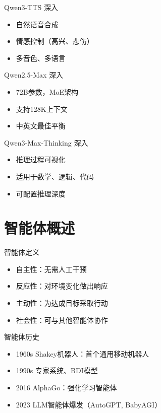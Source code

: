 \begin{frame}{Qwen3-TTS 深入}
\begin{itemize}
\item 自然语音合成
\item 情感控制（高兴、悲伤）
\item 多音色、多语言
\end{itemize}
\end{frame}
\begin{frame}{Qwen2.5-Max 深入}
\begin{itemize}
\item 72B参数，MoE架构
\item 支持128K上下文
\item 中英文最佳平衡
\end{itemize}
\end{frame}
\begin{frame}{Qwen3-Max-Thinking 深入}
\begin{itemize}
\item 推理过程可视化
\item 适用于数学、逻辑、代码
\item 可配置推理深度
\end{itemize}
\end{frame}


\section{智能体概述}

\begin{frame}{智能体定义}
\begin{center}
\end{center}
\begin{itemize}
\item 自主性：无需人工干预
\item 反应性：对环境变化做出响应
\item 主动性：为达成目标采取行动
\item 社会性：可与其他智能体协作
\end{itemize}
\end{frame}

\begin{frame}{智能体历史}
\begin{itemize}
\item 1960s Shakey机器人：首个通用移动机器人
\item 1990s 专家系统、BDI模型
\item 2016 AlphaGo：强化学习智能体
\item 2023 LLM智能体爆发（AutoGPT, BabyAGI）
\end{itemize}
\end{frame}

